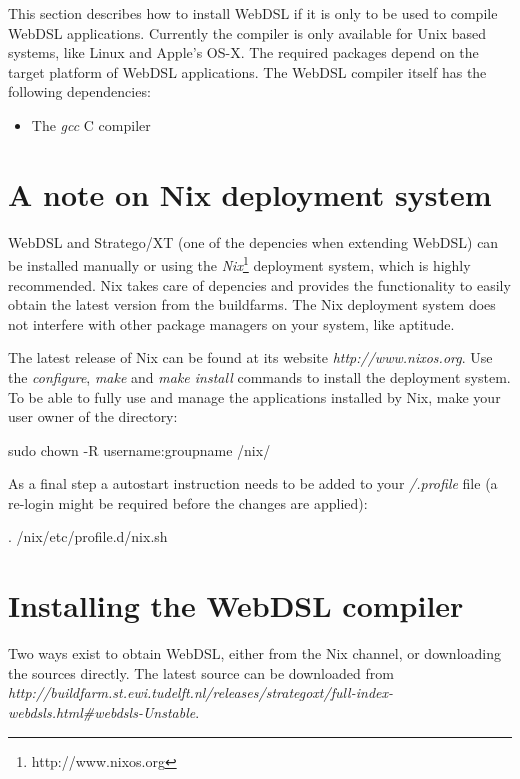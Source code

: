 This section describes how to install WebDSL if it is only to be used to compile WebDSL applications. Currently the compiler is only available for Unix based systems, like Linux and Apple's OS-X. The required packages depend on the target platform of WebDSL applications. The WebDSL compiler itself has the following dependencies:
\begin{itemize}
	\item The \emph{gcc} C compiler
\end{itemize}

\section{A note on Nix deployment system}\label{installnix}
WebDSL and Stratego/XT (one of the depencies when extending WebDSL) can be installed manually or using the \emph{Nix}\footnote{http://www.nixos.org} deployment system, which is highly recommended. Nix takes care of depencies and provides the functionality to easily obtain the latest version from the buildfarms. The Nix deployment system does not interfere with other package managers on your system, like aptitude. 

The latest release of Nix can be found at its website \emph{http://www.nixos.org}. Use the \emph{configure}, \emph{make} and \emph{make install} commands to install the deployment system. To be able to fully use and manage the applications installed by Nix, make your user owner of the  directory:
\begin{shell}
sudo chown -R username:groupname /nix/
\end{shell}
As a final step a autostart instruction needs to be added to your \emph{\tilde/.profile} file (a re-login might be required before the changes are applied):
\begin{shell}
. /nix/etc/profile.d/nix.sh
\end{shell}

\section{Installing the WebDSL compiler}\label{retreivewebdsl}
Two ways exist to obtain WebDSL, either from the Nix channel, or downloading the sources directly. The latest source can be downloaded from \\\emph{http://buildfarm.st.ewi.tudelft.nl/releases/strategoxt/full-index-webdsls.html\#webdsls-Unstable}.

